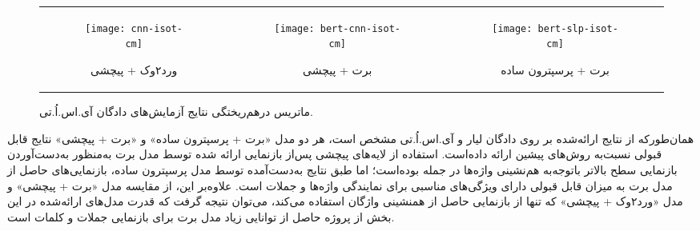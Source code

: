 \begin{figure}[!h]
	\centering
	\begin{tabular}{ccc}
		\begin{subfigure}{0.33\textwidth}
			\centering
			\caption{ورد۲وک + پیچشی}
			\texttt{[image: cnn-isot-cm]}
		\end{subfigure}
		& 
		\begin{subfigure}{0.33\textwidth}
			\centering
			\caption{برت + پیچشی}
			\texttt{[image: bert-cnn-isot-cm]}
		\end{subfigure}
		&
		\begin{subfigure}{0.33\textwidth}
			\centering
			\caption{برت + پرسپترون ساده}
			\texttt{[image: bert-slp-isot-cm]}
		\end{subfigure}
	\end{tabular}
	\caption{ماتریس درهم‌ریختگی نتایج آزمایش‌های دادگان آی.اس.اُ.تی.}
	\label{ISOT-CM}
\end{figure}



همان‌طورکه از نتایج ارائه‌شده بر روی دادگان لیار و آی.اس.اُ.تی مشخص است، هر دو مدل «برت +‌ پرسپترون ساده» و «برت + پیچشی» نتایج قابل قبولی نسبت‌به روش‌های پیشین ارائه داده‌است. استفاده از لایه‌های پیچشی پس‌از بازنمایی ارائه شده توسط مدل برت به‌منظور به‌دست‌آوردن بازنمایی سطح بالاتر باتوجه‌به هم‌نشینی واژه‌ها در جمله بوده‌است؛ اما طبق نتایج به‌دست‌آمده توسط مدل پرسپترون ساده، بازنمایی‌های حاصل از مدل برت به میزان قابل قبولی دارای ویژگی‌های مناسبی برای نمایندگی واژه‌ها و جملات است. علاوه‌بر این، از مقایسه مدل «برت +‌ پیچشی» و مدل «ورد۲وک + پیچشی» که تنها از بازنمایی حاصل از همنشینی واژگان استفاده می‌کند، می‌توان نتیجه گرفت که قدرت مدل‌های ارائه‌شده در این بخش از پروژه حاصل از توانایی زیاد مدل برت برای بازنمایی جملات و کلمات است.
